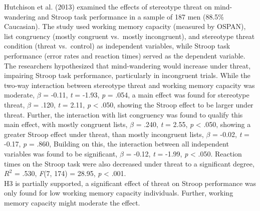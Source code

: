 \documentclass[
  stu, a4paper, 12pt,mask,floatsintext]{apa7}
\begin{document}
Hutchison et al. (2013) examined the effects of stereotype threat on mind-wandering and Stroop task performance in a sample of 187 men (88.5\% Caucasian). The study used working memory capacity (measured by OSPAN), list congruency (mostly congruent vs.~mostly incongruent), and stereotype threat condition (threat vs.~control) as independent variables, while Stroop task performance (error rates and reaction times) served as the dependent variable. The researchers hypothesized that mind-wandering would increase under threat, impairing Stroop task performance, particularly in incongruent trials.
While the two-way interaction between stereotype threat and working memory capacity was moderate, \(\beta\) = -0.11, \emph{t} = -1.93, \emph{p} = .054, a main effect was found for stereotype threat, \(\beta\) = .120, \emph{t} = 2.11, \emph{p} \textless{} .050, showing the Stroop effect to be larger under threat.
Further, the interaction with list congruency was found to qualify this main effect, with mostly congruent lists, \(\beta\) = .240, \emph{t} = 2.55, \emph{p} \textless{} .050, showing a greater Stroop effect under threat, than mostly incongruent lists, \(\beta\) = -0.02, \emph{t} = -0.17, \emph{p} = .860,
Building on this, the interaction between all independent variables was found to be significant, \(\beta\) = -0.12, \emph{t} = -1.99, \emph{p} \textless{} .050.
Reaction times on the Stroop task were also decreased under threat to a significant degree, \(R^2\) = .530, \emph{F}(7, 174) = 28.95, \emph{p} \textless{} .001.\\
H3 is partially supported, a significant effect of threat on Stroop performance was only found for low working memory capacity individuals.
Further, working memory capacity might moderate the effect.
\end{document}
